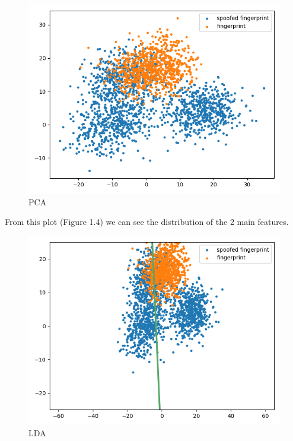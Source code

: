 \documentclass[english]{report}
\begin{document}
    \begin{figure}[H]
        \centering
        
        \includegraphics[scale=0.5]{../../images/feature_plot/PCA_m=2.png}
        \caption{PCA}
    \end{figure}

    From this plot (Figure 1.4) we can see the distribution of the 2 main features.

    \begin{figure}[H]
        \centering
        
        \includegraphics[scale=0.5]{../../images/feature_plot/PCA_m=2 + LDA.png}
        \caption{LDA}
    \end{figure}
\end{document}
